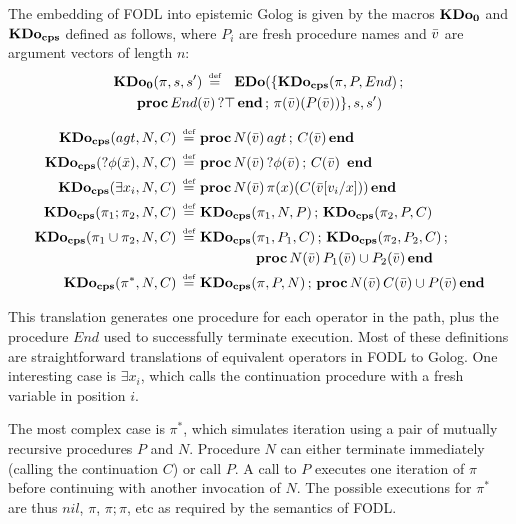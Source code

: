 \begin{defnL}
 The embedding of FODL into
epistemic Golog is given by the macros $\mathbf{KDo_{0}}$ and $\mathbf{KDo_{cps}}$ defined
as follows, where $P_{i}$ are fresh procedure names and $\bar{v}$
are argument vectors of length $n$:\begin{multline*}
\mathbf{KDo_{0}}(\pi,s,s')\,\stackrel{\mbox{\tiny def}}{=}\,\,\ \mathbf{EDo}(\{\mathbf{KDo_{cps}}(\pi,P,End)\,;\,\\
\mathbf{proc}\, End(\bar{v})\,?\top\,\mathbf{end}\,;\,\pi(\bar{v})(P(\bar{v}))\},s,s')\end{multline*}

\end{defnL}
\begin{align*}
\mathbf{KDo_{cps}}(agt,N,C)\,\stackrel{\mbox{\tiny def}}{=}\,\, & \mathbf{proc}\, N(\bar{v})\, agt\,;\, C(\bar{v})\,\mathbf{end}\\
\mathbf{KDo_{cps}}(?\phi(\bar{x}),N,C)\,\stackrel{\mbox{\tiny def}}{=}\,\, & \mathbf{proc}\, N(\bar{v})\,?\phi(\bar{v})\,;\, C(\bar{v})\,\ \mathbf{end}\\
\mathbf{KDo_{cps}}(\exists x_{i},N,C)\,\stackrel{\mbox{\tiny def}}{=}\,\, & \mathbf{proc}\, N(\bar{v})\,\pi(x)(C(\bar{v}[v_{i}/x]))\,\mathbf{end}\\
\mathbf{KDo_{cps}}(\pi_{1};\pi_{2},N,C)\,\stackrel{\mbox{\tiny def}}{=}\,\, & \mathbf{KDo_{cps}}(\pi_{1},N,P)\,;\,\mathbf{KDo_{cps}}(\pi_{2},P,C)\\
\mathbf{KDo_{cps}}(\pi_{1}\cup\pi_{2},N,C)\,\stackrel{\mbox{\tiny def}}{=}\,\, & \mathbf{KDo_{cps}}(\pi_{1},P_{1},C)\,;\,\mathbf{KDo_{cps}}(\pi_{2},P_{2},C)\,;\\
 & \,\mathbf{\,\,\,\,\,\,\,\,\,\,\,\,\,\,\,\,\,\,\,\,\,\,\, proc}\, N(\bar{v})\, P_{1}(\bar{v})\cup P_{2}(\bar{v})\,\mathbf{end}\\
\mathbf{KDo_{cps}}(\pi^{*},N,C)\,\stackrel{\mbox{\tiny def}}{=}\,\, & \mathbf{KDo_{cps}}(\pi,P,N)\,;\,\mathbf{proc}\, N(\bar{v})\, C(\bar{v})\cup P(\bar{v})\,\mathbf{end}\end{align*}


This translation generates one procedure for each operator in the
path, plus the procedure $End$ used to successfully terminate execution.
Most of these definitions are straightforward translations of equivalent
operators in FODL to Golog. One interesting case is $\exists x_{i}$,
which calls the continuation procedure with a fresh variable in position
$i$.

The most complex case is $\pi^{*}$, which simulates iteration using
a pair of mutually recursive procedures $P$ and $N$. Procedure $N$
can either terminate immediately (calling the continuation $C$) or
call $P$. A call to $P$ executes one iteration of $\pi$ before
continuing with another invocation of $N$. The possible executions
for $\pi^{*}$ are thus $nil$, $\pi$, $\pi;\pi$, etc as required
by the semantics of FODL.

